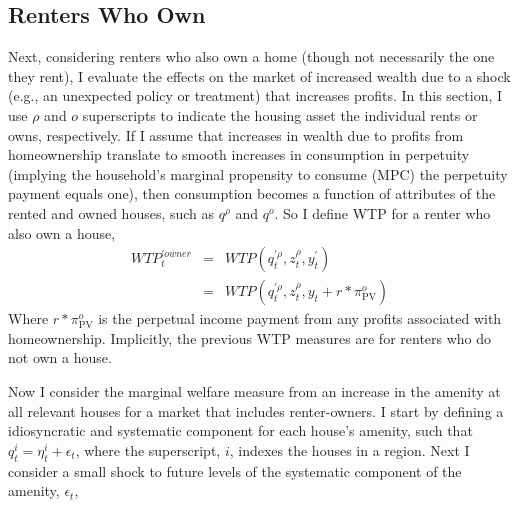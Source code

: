 \documentclass[ecta,nameyear,draft]{econsocart}
\theoremstyle{plain}
\theoremstyle{remark}
\begin{document}
\subsection{Renters Who Own}
Next, considering renters who also own a home (though not necessarily the one they rent), I evaluate the effects on the market of increased wealth due to a shock (e.g., an unexpected policy or treatment) that increases profits. In this section, I use $\rho$ and $o$ superscripts to indicate the housing asset the individual rents or owns, respectively. If I assume that increases in wealth due to profits from homeownership translate to smooth increases in consumption in perpetuity (implying the household's marginal propensity to consume (MPC) the perpetuity payment equals one), then consumption becomes a function of attributes of the rented and owned houses, such as $q^\rho$ and $q^o$. So I define WTP for a renter who also own a house,
\begin{eqnarray*}
	\mathit{WTP}_t^{\prime\mathit{owner}}&=&\mathit{WTP}(q_t^{\prime \rho},z_t^\rho,y_t^\prime)\\
	&=&\mathit{WTP}(q_t^{\prime \rho},z_t^\rho,y_t+r*\pi^o_{\mathrm{PV}})
\end{eqnarray*}
Where $r*\pi_{\mathrm{PV}}^o$ is the perpetual income payment from any profits associated with homeownership. Implicitly, the previous WTP measures are for renters who do not own a house.

Now I consider the marginal welfare measure from an increase in the amenity at all relevant houses for a market that includes renter-owners. I start by defining a idiosyncratic and systematic component for each house's amenity, such that $q_{t}^i=\eta_{t}^i+\epsilon_t$, where the superscript, $i$, indexes the houses in a region. Next I consider a small shock to future levels of the systematic component of the amenity, $\epsilon_t$,%
\end{document}
